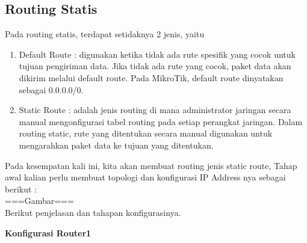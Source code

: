 \subsection{Routing Statis}
Pada routing statis, terdapat setidaknya 2 jenis, yaitu
\begin{enumerate}
	\item Default Route : digunakan ketika tidak ada rute spesifik yang cocok untuk tujuan pengiriman data. Jika tidak ada rute yang cocok, paket data akan dikirim melalui default route. Pada MikroTik, default route dinyatakan sebagai 0.0.0.0/0.
	\item Static Route : adalah jenis routing di mana administrator jaringan secara manual mengonfigurasi tabel routing pada setiap perangkat jaringan. Dalam routing static, rute yang ditentukan secara manual digunakan untuk mengarahkan paket data ke tujuan yang ditentukan.
\end{enumerate}
Pada kesempatan kali ini, kita akan membuat routing jenis static route, Tahap awal kalian
perlu membuat topologi dan konfigurasi IP Address nya sebagai berikut :\\
===Gambar===\\Berikut penjelasan dan tahapan konfigurasinya.
\begin{center}
	\textbf{Konfigurasi Router1}
\end{center}

